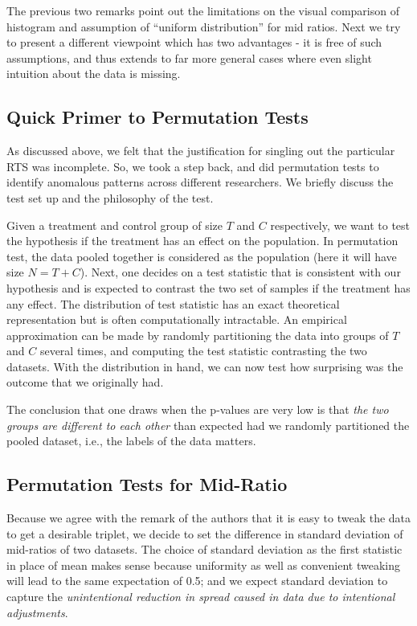\documentclass{article}
\begin{document}
The previous two remarks point out the limitations on the visual
comparison of histogram and assumption of ``uniform distribution'' for
mid ratios. Next we try to present a different viewpoint which has two advantages - it is free of such assumptions, and thus extends to far more general cases where even slight intuition about the data is missing.



    \subsection{Quick Primer to Permutation
Tests}\label{quick-primer-to-permutation-tests}

As discussed above, we felt that the justification for
singling out the particular RTS was incomplete. So, we took a step back,
and did permutation tests to identify anomalous patterns across different
researchers. We briefly discuss the test set up and the philosophy of the test.

Given a treatment and control group of size \(T\) and \(C\)
respectively, we want to test the hypothesis if the treatment has an
effect on the population. In permutation test, the data pooled together
is considered as the population (here it will have size \(N = T+C\)).
Next, one decides on a test statistic that is consistent with our
hypothesis and is expected to contrast the two set of samples if the
treatment has any effect. The distribution of test statistic has an
exact theoretical representation but is often computationally
intractable. An empirical approximation can be made by randomly
partitioning the data into groups of \(T\) and \(C\) several times, and
computing the test statistic contrasting the two datasets. With the
distribution in hand, we can now test how surprising was the outcome
that we originally had.

The conclusion that one draws when the p-values are very low is that \textit{the
two groups are different to each other} than expected had we randomly partitioned
the pooled dataset, i.e., the labels of the data matters.


    \subsection{Permutation Tests for
Mid-Ratio}\label{permutation-tests-for-mid-ratio}

Because we agree with the remark of the authors that it is easy to tweak
the data to get a desirable triplet, we decide to set the difference in
standard deviation of mid-ratios of two datasets. The choice of standard deviation as the first statistic in place of mean
makes sense because uniformity as well as convenient tweaking will lead
to the same expectation of 0.5; and we expect standard deviation to capture
the \textit{unintentional reduction in spread caused in data due to
intentional adjustments}.
\end{document}
